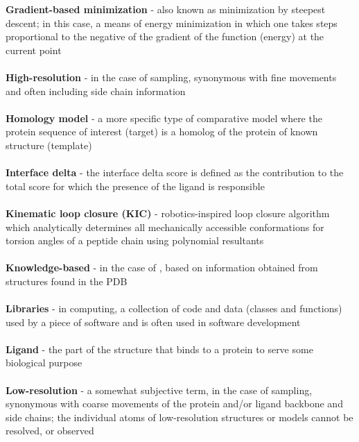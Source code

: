 \textbf{Gradient-based minimization} - also known as minimization by steepest descent; in this case, a means of energy minimization in which one takes steps proportional to the negative of the gradient of the function (energy) at the current point \\ \\

\textbf{High-resolution} - in the case of sampling, synonymous with fine movements and often including side chain information \\ \\

\textbf{Homology model} - a more specific type of comparative model where the protein sequence of interest (target) is a homolog of the protein of known structure (template) \\ \\

\textbf{Interface delta} - the interface delta score is defined as the contribution to the total score for which the presence of the ligand is responsible \\ \\

\textbf{Kinematic loop closure (KIC)} - robotics-inspired loop closure algorithm which analytically determines all mechanically accessible conformations for torsion angles of a peptide chain using polynomial resultants \\ \\

\textbf{Knowledge-based} - in the case of \rosetta, based on information obtained from structures found in the PDB \\ \\

\textbf{Libraries} - in computing, a collection of code and data (classes and functions) used by a piece of software and is often used in software development \\ \\

\textbf{Ligand} - the part of the structure that binds to a protein to serve some biological purpose \\ \\

\textbf{Low-resolution} - a somewhat subjective term, in the case of sampling, synonymous with coarse movements of the protein and/or ligand backbone and side chains; the individual atoms of low-resolution structures or models cannot be resolved, or observed \\ \\

